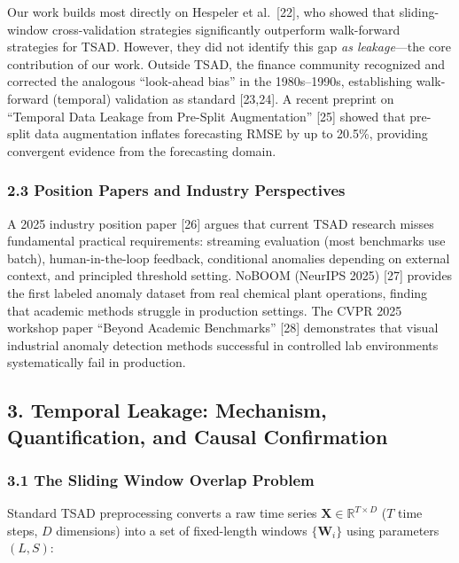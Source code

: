 \documentclass[
]{article}
\begin{document}
Our work builds most directly on Hespeler et al.~{[}22{]}, who showed
that sliding-window cross-validation strategies significantly outperform
walk-forward strategies for TSAD. However, they did not identify this
gap \emph{as leakage}---the core contribution of our work. Outside TSAD,
the finance community recognized and corrected the analogous
``look-ahead bias'' in the 1980s--1990s, establishing walk-forward
(temporal) validation as standard {[}23,24{]}. A recent preprint on
``Temporal Data Leakage from Pre-Split Augmentation'' {[}25{]} showed
that pre-split data augmentation inflates forecasting RMSE by up to
20.5\%, providing convergent evidence from the forecasting domain.

\subsubsection{2.3 Position Papers and Industry
Perspectives}\label{position-papers-and-industry-perspectives}

A 2025 industry position paper {[}26{]} argues that current TSAD
research misses fundamental practical requirements: streaming evaluation
(most benchmarks use batch), human-in-the-loop feedback, conditional
anomalies depending on external context, and principled threshold
setting. NoBOOM (NeurIPS 2025) {[}27{]} provides the first labeled
anomaly dataset from real chemical plant operations, finding that
academic methods struggle in production settings. The CVPR 2025 workshop
paper ``Beyond Academic Benchmarks'' {[}28{]} demonstrates that visual
industrial anomaly detection methods successful in controlled lab
environments systematically fail in production.

\subsection{3. Temporal Leakage: Mechanism, Quantification, and Causal
Confirmation}\label{temporal-leakage-mechanism-quantification-and-causal-confirmation}

\subsubsection{3.1 The Sliding Window Overlap
Problem}\label{the-sliding-window-overlap-problem}

Standard TSAD preprocessing converts a raw time series
\(\mathbf{X} \in \mathbb{R}^{T \times D}\) (\(T\) time steps, \(D\)
dimensions) into a set of fixed-length windows \(\{\mathbf{W}_i\}\)
using parameters \((L, S)\):
\end{document}
